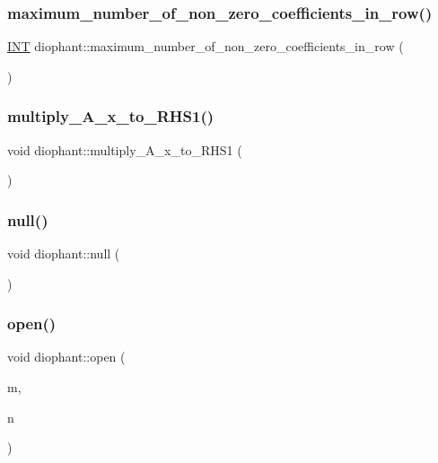\subsubsection{\texorpdfstring{maximum\+\_\+number\+\_\+of\+\_\+non\+\_\+zero\+\_\+coefficients\+\_\+in\+\_\+row()}{maximum\_number\_of\_non\_zero\_coefficients\_in\_row()}}
{\footnotesize\ttfamily \mbox{\hyperlink{galois_8h_a09fddde158a3a20bd2dcadb609de11dc}{I\+NT}} diophant\+::maximum\+\_\+number\+\_\+of\+\_\+non\+\_\+zero\+\_\+coefficients\+\_\+in\+\_\+row (\begin{DoxyParamCaption}{ }\end{DoxyParamCaption})}

\mbox{\label{classdiophant_ae6f3c4bb82b979701c67049310d824e6}} 
\subsubsection{\texorpdfstring{multiply\+\_\+\+A\+\_\+x\+\_\+to\+\_\+\+R\+H\+S1()}{multiply\_A\_x\_to\_RHS1()}}
{\footnotesize\ttfamily void diophant\+::multiply\+\_\+\+A\+\_\+x\+\_\+to\+\_\+\+R\+H\+S1 (\begin{DoxyParamCaption}{ }\end{DoxyParamCaption})}

\mbox{\label{classdiophant_a9437e7af60e3eb88106619e585a0caed}} 
\subsubsection{\texorpdfstring{null()}{null()}}
{\footnotesize\ttfamily void diophant\+::null (\begin{DoxyParamCaption}{ }\end{DoxyParamCaption})}

\mbox{\label{classdiophant_a182e2928400c2e7fc01f4155cec72b57}} 
\subsubsection{\texorpdfstring{open()}{open()}}
{\footnotesize\ttfamily void diophant\+::open (\begin{DoxyParamCaption}\item[{\mbox{\hyperlink{galois_8h_a09fddde158a3a20bd2dcadb609de11dc}{I\+NT}}}]{m,  }\item[{\mbox{\hyperlink{galois_8h_a09fddde158a3a20bd2dcadb609de11dc}{I\+NT}}}]{n }\end{DoxyParamCaption})}

